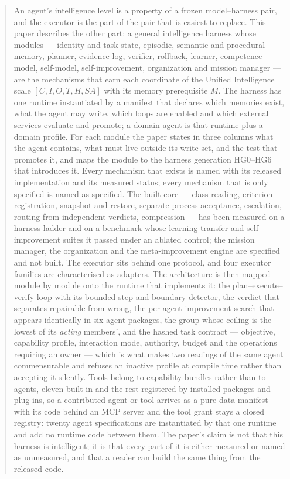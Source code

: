 \begin{abstract}
An agent's intelligence level is a property of a frozen model--harness pair, and the executor is the part of the pair that is easiest to replace. This paper describes the other part: a general intelligence harness whose modules --- identity and task state, episodic, semantic and procedural memory, planner, evidence log, verifier, rollback, learner, competence model, self-model, self-improvement, organization and mission manager --- are the mechanisms that earn each coordinate of the Unified Intelligence scale $[C,I,O,T,H,SA]$ with its memory prerequisite $M$. The harness has one runtime instantiated by a manifest that declares which memories exist, what the agent may write, which loops are enabled and which external services evaluate and promote; a domain agent is that runtime plus a domain profile. For each module the paper states in three columns what the agent contains, what must live outside its write set, and the test that promotes it, and maps the module to the harness generation HG0--HG6 that introduces it. Every mechanism that exists is named with its released implementation and its measured status; every mechanism that is only specified is named as specified. The built core --- class reading, criterion registration, snapshot and restore, separate-process acceptance, escalation, routing from independent verdicts, compression --- has been measured on a harness ladder and on a benchmark whose learning-transfer and self-improvement suites it passed under an ablated control; the mission manager, the organization and the meta-improvement engine are specified and not built. The executor sits behind one protocol, and four executor families are characterised as adapters. The architecture is then mapped module by module onto the runtime that implements it: the plan--execute--verify loop with its bounded step and boundary detector, the verdict that separates repairable from wrong, the per-agent improvement search that appears identically in six agent packages, the group whose ceiling is the lowest of its \emph{acting} members', and the hashed task contract --- objective, capability profile, interaction mode, authority, budget and the operations requiring an owner --- which is what makes two readings of the same agent commensurable and refuses an inactive profile at compile time rather than accepting it silently. Tools belong to capability bundles rather than to agents, eleven built in and the rest registered by installed packages and plug-ins, so a contributed agent or tool arrives as a pure-data manifest with its code behind an MCP server and the tool grant stays a closed registry: twenty agent specifications are instantiated by that one runtime and add no runtime code between them. The paper's claim is not that this harness is intelligent; it is that every part of it is either measured or named as unmeasured, and that a reader can build the same thing from the released code.
\end{abstract}

